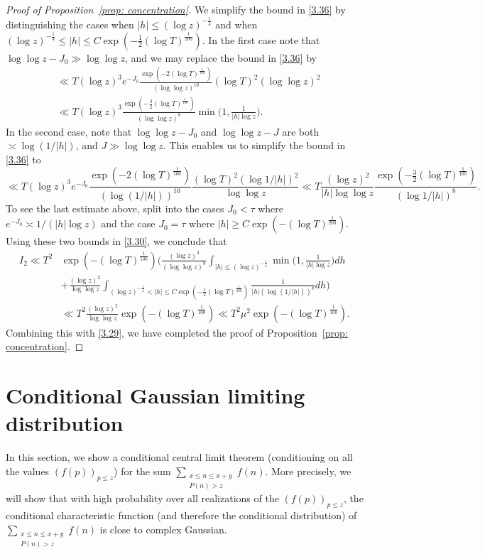 \documentclass[12pt, notitlepage]{amsart}
\numberwithin{equation}{section}
\theoremstyle{remark}
\theoremstyle{definition}
\theoremstyle{remark}
\numberwithin{equation}{section}
\begin{document}
\begin{proof}[Proof of Proposition~\ref{prop: concentration}]
We simplify the bound in \eqref{3.36} by distinguishing the cases when $|h| \le (\log z)^{-\frac 14}$ and when $(\log z)^{-\frac 14} \le |h| \le C\exp(-\frac 12(\log T)^{\frac{1}{200}})$.  In the first case note that $\log \log z -J_0 \gg \log \log z$, and we may replace the bound in \eqref{3.36} by 
\begin{align*}
&\ll T (\log z)^3 e^{-J_0} \frac{\exp(-2(\log T)^{\frac 1{100}})}{(\log \log z)^{10}} (\log T)^2 (\log \log z)^2 
\\
&\ll T (\log z)^3 \frac{\exp(-\frac 32(\log T)^{\frac 1{100}})}{(\log \log z)^{8}} \min \Big( 1, \frac{1}{|h| \log z}\Big).
\end{align*}
 In the second case, note that $\log \log z -J_0$ and $\log \log z -J$ are both $\asymp \log (1/|h|)$, and $J \gg \log \log z$.  This enables us to simplify the bound in \eqref{3.36} to 
 $$ 
 \ll T (\log z)^3 e^{-J_0} \frac{ \exp(-2(\log T)^{\frac 1{100}})}{(\log (1/|h|))^{10}}\frac{ (\log T)^2 (\log 1/|h|)^2 }{\log \log z} 
 \ll T \frac{(\log z)^2}{|h| \log \log z}  \frac{\exp(-\frac 32(\log T)^{\frac 1{100}})}{(\log 1/|h|)^{8}}.  
 $$ 
 To see the last estimate above, split into the cases $J_0 <\tau$ where $e^{-J_0} \asymp 1/(|h|\log z)$ and the case $J_0=\tau$ where $|h| \ge C\exp(-(\log T)^{\frac 1{200}})$.  
 Using these two bounds in \eqref{3.30}, we conclude that 
 \begin{align*}
 I_2\ll T^2 &\exp(-(\log T)^{\frac 1{100}}) \Big( \frac{(\log z)^3}{(\log \log z)^8}  \int_{|h|\le (\log z)^{-\frac 14}} \min\Big(1, \frac{1}{|h|\log z}\Big) dh \\
 &+   \frac{(\log z)^2}{\log \log z} \int_{(\log z)^{-\frac 14} < |h| \le C\exp(-\frac 12(\log T)^{\frac{1}{200}})} \frac{1}{|h| (\log (1/|h|))^8} dh \Big) \\
 &\ll T^2 \frac{(\log z)^2}{\log \log z} \exp(-(\log T)^{\frac{1}{100}}) \ll T^2 \mu^2  \exp(-(\log T)^{\frac{1}{100}}). 
 \end{align*}
Combining this with \eqref{3.29}, we have completed the proof of Proposition~\ref{prop: concentration}.  
\end{proof} 
 
 \section{Conditional Gaussian limiting distribution}\label{Sec: CLT}
 In this section, we show a conditional central limit theorem (conditioning on all the values $(f(p))_{p\le z}$) for the sum $\sum_{\substack{x\le n \le x+y \\ P(n)>z}  } f(n)$. More precisely, we will show that with high probability over all realizations of the $(f(p))_{p\le z}$, the conditional characteristic function (and therefore the conditional distribution) of $\sum_{\substack{x\le n \le x+y \\ P(n)>z}  } f(n)$ is close to complex Gaussian.
 
\end{document}

